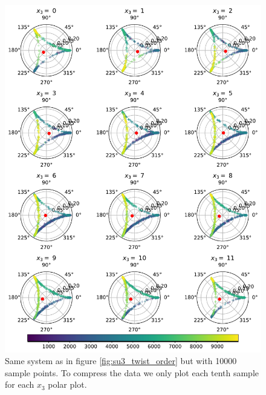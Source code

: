 \documentclass[english,twoside,openright]{UH_TCM_MSc}
\begin{document}
\begin{figure}[htpb]
    \centering
    \includegraphics[width=1\textwidth]{final_plots/misc/z_index_moves.pdf}
    \caption{Same system as in figure \ref{fig:su3_twist_order} but with 10000 sample points. To compress the data we only plot each tenth sample for each $x_3$ polar plot.}
    \label{fig:su3_twist_order_moves}
\end{figure}
\end{document}
